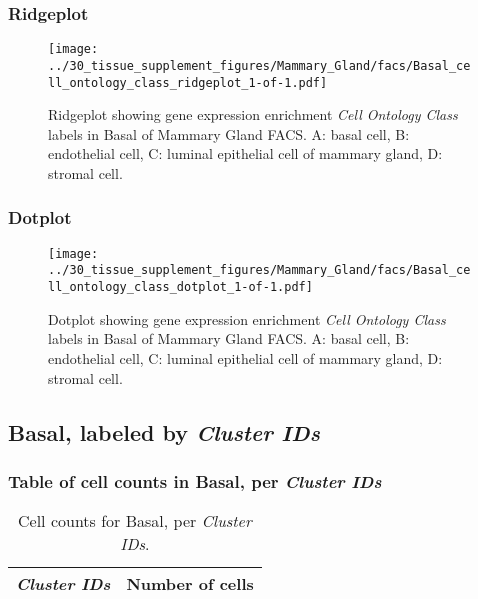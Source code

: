 \clearpage

\subsubsection{Ridgeplot}
\begin{figure}[h]
\centering
\texttt{[image: ../30\_tissue\_supplement\_figures/Mammary\_Gland/facs/Basal\_cell\_ontology\_class\_ridgeplot\_1-of-1.pdf]}

\caption{ Ridgeplot  showing gene expression enrichment \emph{Cell Ontology Class} labels in Basal of Mammary Gland FACS. A: basal cell, B: endothelial cell, C: luminal epithelial cell of mammary gland, D: stromal cell.}
\end{figure}


\clearpage

\subsubsection{Dotplot}
\begin{figure}[h]
\centering
\texttt{[image: ../30\_tissue\_supplement\_figures/Mammary\_Gland/facs/Basal\_cell\_ontology\_class\_dotplot\_1-of-1.pdf]}

\caption{ Dotplot  showing gene expression enrichment \emph{Cell Ontology Class} labels in Basal of Mammary Gland FACS. A: basal cell, B: endothelial cell, C: luminal epithelial cell of mammary gland, D: stromal cell.}
\end{figure}


\clearpage

\subsection{Basal, labeled by \emph{Cluster IDs}}
\subsubsection{Table of cell counts in Basal, per \emph{Cluster IDs}}\begin{table}[h]
\centering
\label{my-label}
\begin{tabular}{@{}ll@{}}
\toprule

\emph{Cluster IDs}& Number of cells \\ \midrule\bottomrule
\end{tabular}
\caption{Cell counts for Basal, per \emph{Cluster IDs}.}
\end{table}

